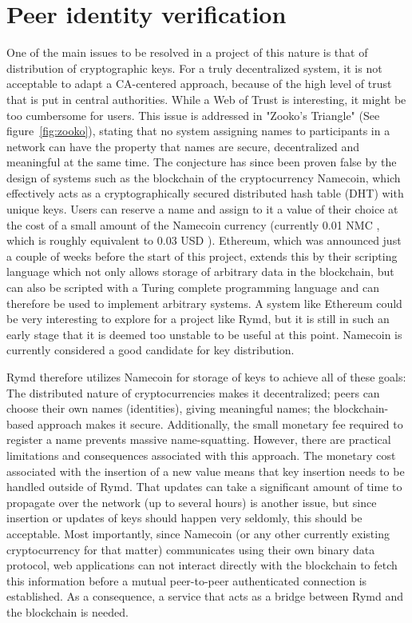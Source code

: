 \section{Peer identity verification}
\label{sec:authorization}
One of the main issues to be resolved in a project of this nature is that of distribution of cryptographic keys. For a truly decentralized system, it is not acceptable to adapt a CA-centered approach, because of the high level of trust that is put in central authorities. While a Web of Trust is interesting, it might be too cumbersome for users. This issue is addressed in "Zooko's Triangle" (See figure~\ref{fig:zooko}), stating that no system assigning names to participants in a network can have the property that names are secure, decentralized and meaningful at the same time\cite{Zooko:2001:Online}. The conjecture has since been proven false by the design of systems such as the blockchain of the cryptocurrency Namecoin, which effectively acts as a cryptographically secured distributed hash table (DHT) with unique keys. Users can reserve a name and assign to it a value of their choice at the cost of a small amount of the Namecoin currency (currently 0.01 NMC \cite{Namecoin:2014:Online}, which is roughly equivalent to 0.03 USD \cite{CryptoCoinCharts:2014:Online}). Ethereum, which was announced just a couple of weeks before the start of this project, extends this by their scripting language which not only allows storage of arbitrary data in the blockchain, but can also be scripted with a Turing complete programming language and can therefore be used to implement arbitrary systems. A system like Ethereum could be very interesting to explore for a project like Rymd, but it is still in such an early stage that it is deemed too unstable to be useful at this point. Namecoin is currently considered a good candidate for key distribution.

Rymd therefore utilizes Namecoin for storage of keys to achieve all of these goals: The distributed nature of cryptocurrencies makes it decentralized; peers can choose their own names (identities), giving meaningful names; the blockchain-based approach makes it secure. Additionally, the small monetary fee required to register a name prevents massive name-squatting. However, there are practical limitations and consequences associated with this approach. The monetary cost associated with the insertion of a new value means that key insertion needs to be handled outside of Rymd. That updates can take a significant amount of time to propagate over the network (up to several hours) is another issue, but since insertion or updates of keys should happen very seldomly, this should be acceptable. Most importantly, since Namecoin (or any other currently existing cryptocurrency for that matter) communicates using their own binary data protocol\cite{BitcoinSource:2014:Online}, web applications can not interact directly with the blockchain to fetch this information before a mutual peer-to-peer authenticated connection is established. As a consequence, a service that acts as a bridge between Rymd and the blockchain is needed.

